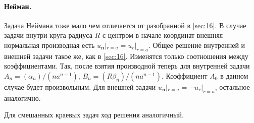 \paragraph{Нейман.} 
Задача Неймана тоже мало чем отличается от разобранной в \ref{sec:16}. В случае задачи внутри круга радиуса $ R $ с центром
в начале координат внешняя нормальная производная есть $ u_{\mathbf n}|_{r = a}
= u_r|_{r = a}$. Общее решение внутренней и внешней задачи такое же, как в
\ref{sec:16}. Изменятся только соотношения между коэффициентами. Так, после
взятия производной теперь для
внутренней задачи $
A_n = (\alpha_n)/(na^{n-1}) $, $ B_n = (R\beta_n)/(na^{n-1}) $. Коэффициент $
A_0 $ в данном случае будет произвольным. Для внешней задачи $
u_{\mathbf n}|_{r=a} = -u_r|_{r=a} $, остальное аналогично.

Для смешанных краевых задач ход решения аналогичный.
